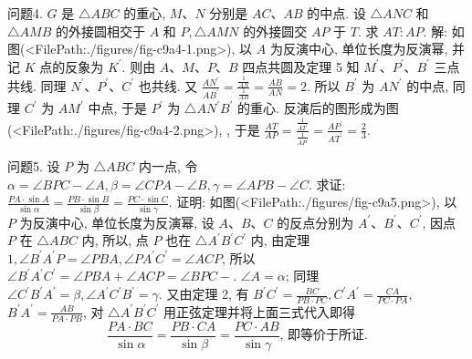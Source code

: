 问题4. $G$ 是 $\triangle A B C$ 的重心, $M 、 N$ 分别是 $A C 、 A B$ 的中点.
设 $\triangle A N C$ 和 $\triangle A M B$ 的外接圆相交于 $A$ 和 $P, \triangle A M N$ 的外接圆交 $A P$ 于 $T$. 求 $A T: A P$.
解: 如图(<FilePath:./figures/fig-c9a4-1.png>), 以 $A$ 为反演中心, 单位长度为反演幂,
并记 $K$ 点的反象为 $K^{\prime}$. 则由 $A 、 M 、 P 、 B$ 四点共圆及定理 5 知 $M^{\prime} 、 P^{\prime} 、 B^{\prime}$ 三点共线.
同理 $N^{\prime} 、 P^{\prime} 、 C^{\prime}$ 也共线.
又 $\frac{A N^{\prime}}{A B^{\prime}}=\frac{\frac{1}{A N}}{\frac{1}{A B}}=\frac{A B}{A N}=2$. 所以 $B^{\prime}$ 为 $A N^{\prime}$ 的中点, 同理 $C^{\prime}$ 为 $A M^{\prime}$ 中点, 于是 $P^{\prime}$ 为 $\triangle A N^{\prime} B^{\prime}$ 的重心.
反演后的图形成为图(<FilePath:./figures/fig-c9a4-2.png>), , 于是 $\frac{A T}{A P}=\frac{\frac{1}{A T^{\prime}}}{\frac{1}{A P^{\prime}}}=\frac{A P^{\prime}}{A T^{\prime}}=\frac{2}{3}$.



问题5. 设 $P$ 为 $\triangle A B C$ 内一点, 令 $\alpha=\angle B P C-\angle A, \beta=\angle C P A-\angle B, \gamma= \angle A P B-\angle C$. 求证: $\frac{P A \cdot \sin A}{\sin \alpha}=\frac{P B \cdot \sin B}{\sin \beta}=\frac{P C \cdot \sin C}{\sin \gamma}$.
证明: 如图(<FilePath:./figures/fig-c9a5.png>), 以 $P$ 为反演中心, 单位长度为反演幂, 设 $A 、 B 、 C$ 的反点分别为 $A^{\prime} 、 B^{\prime} 、 C^{\prime}$, 因点 $P$ 在 $\triangle A B C$ 内, 所以, 点 $P$ 也在 $\triangle A^{\prime} B^{\prime} C^{\prime}$ 内, 由定理 $1, \angle B^{\prime} A^{\prime} P=\angle P B A, \angle P A^{\prime} C^{\prime}=\angle A C P$, 所以 $\angle B^{\prime} A^{\prime} C^{\prime}=\angle P B A+\angle A C P=\angle B P C-$. $\angle A=\alpha$; 同理 $\angle C^{\prime} B^{\prime} A^{\prime}=\beta, \angle A^{\prime} C^{\prime} B^{\prime}=\gamma$. 又由定理 2, 有 $B^{\prime} C^{\prime}=\frac{B C}{P B \cdot P C}, C^{\prime} A^{\prime}=\frac{C A}{P C \cdot P A}$, $B^{\prime} A^{\prime}=\frac{A B}{P A \cdot P B}$, 对 $\triangle A^{\prime} B^{\prime} C^{\prime}$ 用正弦定理并将上面三式代入即得
$$
\frac{P A \cdot B C}{\sin \alpha}=\frac{P B \cdot C A}{\sin \beta}=\frac{P C \cdot A B}{\sin \gamma} \text {, 即等价于所证.
}
$$



